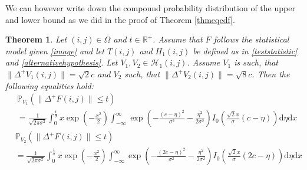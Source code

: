 \documentclass[a4paper,12pt]{article}
\newcommand{\norm}[1]{\lVert#1\rVert}
\theoremstyle{plain}
\newtheorem{theorem}{Theorem}[section]
\theoremstyle{definition}
\begin{document}
We can however write down the compound probability distribution of the upper and lower bound as we did in the proof of Theorem \ref{thmeqcdf}.

\begin{theorem}\label{thmcompprob}
	Let $(i, j) \in \Omega$ and $t \in \mathbb{R}^+$. Assume that $F$ follows the statistical model given \eqref{image} and let $T(i, j)$ and $H_1(i, j)$ be defined as in \eqref{teststatistic} and \eqref{alternativehypothesis}. Let $V_1, V_2 \in \mathcal{H}_1(i, j)$. Assume $V_1$ is such, that $\norm{\Delta^+ V_1(i, j)} = \sqrt{2} c$ and $V_2$ such, that $\norm{\Delta^+ V_2(i, j)} = \sqrt{8} c$. Then the following equalities hold:
	\begin{equation}\label{eqcompprobupper}
		\begin{aligned}
			&\mathbb{P}_{V_1}( \norm{\Delta^+ F(i, j)} \leq t ) \\
			&= \frac{1}{\sqrt{2 \pi \sigma^2}} \int_0^\frac{t}{\sigma} x \exp \left( - \frac{x^2}{2} \right) \int_{-\infty}^\infty \exp \left( - \frac{(c - \eta)^2}{\sigma^2} - \frac{\eta^2}{2 \sigma^2} \right) I_0 \left( \frac{\sqrt{2} x}{\sigma} (c - \eta) \right) \mathrm{d}\eta \mathrm{d}x
		\end{aligned}
	\end{equation}
	\begin{equation}\label{eqcompproblower}
		\begin{aligned}
			&\mathbb{P}_{V_2}( \norm{\Delta^+ F(i, j)} \leq t ) \\
			&= \frac{1}{\sqrt{2 \pi \sigma^2}} \int_0^\frac{t}{\sigma} x \exp \left( - \frac{x^2}{2} \right) \int_{-\infty}^\infty \exp \left( - \frac{(2 c - \eta)^2}{\sigma^2} - \frac{\eta^2}{2 \sigma^2} \right) I_0 \left( \frac{\sqrt{2} x}{\sigma} (2 c - \eta) \right) \mathrm{d}\eta \mathrm{d}x
		\end{aligned}
	\end{equation}
\end{theorem}
\end{document}
